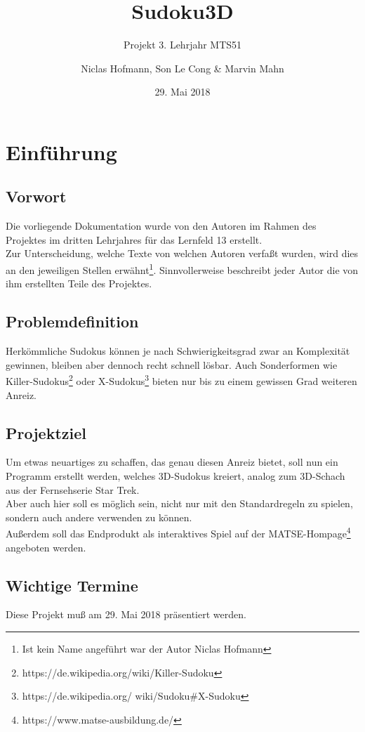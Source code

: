 \documentclass[a4paper,12pt]{scrreprt}
\title{Sudoku3D}
\subtitle{Projekt 3. Lehrjahr MTS51}
\author{Niclas Hofmann, Son Le Cong \& Marvin Mahn}
\date{29. Mai 2018}
\begin{document}
	\maketitle
	\tableofcontents
	
	\chapter{Einf\"uhrung}
	\section{Vorwort}
	Die vorliegende Dokumentation wurde von den Autoren im Rahmen des Projektes im dritten Lehrjahres
	f\"ur das Lernfeld 13 erstellt.\medskip \\
	Zur Unterscheidung, welche Texte von welchen Autoren verfa{\ss}t wurden, wird dies an den jeweiligen
	Stellen erw\"ahnt\footnote{Ist kein Name angef\"uhrt war der Autor Niclas Hofmann}.
	Sinnvollerweise beschreibt jeder Autor die von ihm erstellten Teile des Projektes.
	
	\section{Problemdefinition}
	Herk\"ommliche Sudokus k\"onnen je nach Schwierigkeitsgrad zwar an Komplexit\"at gewinnen,
	bleiben aber dennoch recht schnell l\"osbar. Auch Sonderformen wie Killer-Sudokus\footnote{
	https://de.wikipedia.org/wiki/Killer-Sudoku} oder X-Sudokus\footnote{https://de.wikipedia.org/
	wiki/Sudoku\#X-Sudoku} bieten nur bis zu einem gewissen Grad weiteren Anreiz.

	\section{Projektziel}
	Um etwas neuartiges zu schaffen, das genau diesen Anreiz bietet, soll nun ein Programm erstellt
	werden, welches 3D-Sudokus kreiert, analog zum 3D-Schach aus der Fernsehserie Star Trek.
	\medskip \\
	Aber auch hier soll es m\"oglich sein, nicht nur mit den Standardregeln zu spielen, sondern auch
	andere verwenden zu k\"onnen.\medskip \\
	Au{\ss}erdem soll das Endprodukt als interaktives Spiel auf der MATSE-Hompage\footnote{
	https://www.matse-ausbildung.de/} angeboten werden.

	\section{Wichtige Termine}
	Diese Projekt mu{\ss} am 29. Mai 2018 pr\"asentiert werden.
	
\end{document}
